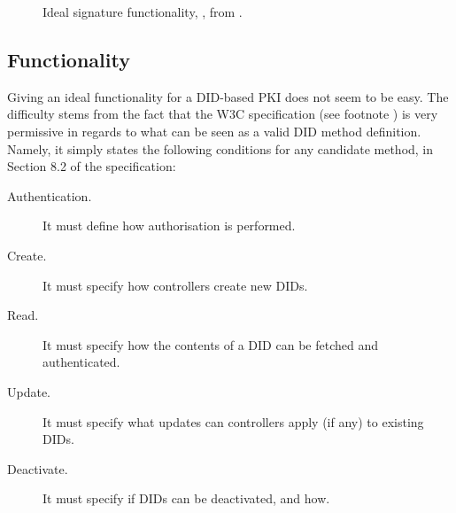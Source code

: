 \begin{figure}
\begin{framed}
\begin{minipage}[t]{0.5\textwidth}
{      }
    \end{minipage}
    \begin{minipage}[t]{0.5\textwidth}
    \end{minipage}
  \end{framed}
  \caption{Ideal signature functionality, \IdealFSig, from \cite{canetti03}.}
  \label{fig:faobb}
\end{figure}

\subsection{Functionality \IdealFPKIDID}


Giving an ideal functionality for a DID-based PKI does not seem to be easy. The
difficulty stems from the fact that the W3C specification (see footnote
) is very permissive in regards to what can be seen as a valid DID
method definition. Namely, it simply states the following conditions for any
candidate method, in Section 8.2 of the specification:

\begin{description}
\item[Authentication.] It must define how authorisation is performed.  
\item[Create.] It must specify how controllers create new DIDs.
\item[Read.] It must specify how the contents of a DID can be fetched and
  authenticated.
\item[Update.] It must specify what updates can controllers apply (if any)
  to existing DIDs.
\item[Deactivate.] It must specify if DIDs can be deactivated, and how.
\end{description}

